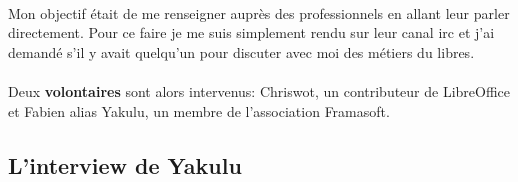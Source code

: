 \documentclass[a4paper,12pt, draft]{report}
\begin{document}
\paragraph{}
Mon objectif était de me renseigner auprès des professionnels en allant leur parler directement. Pour ce faire je me suis simplement rendu sur leur canal irc et j'ai demandé s'il y avait quelqu'un pour discuter avec moi des métiers du libres. 

\paragraph{}
Deux \textbf{volontaires} sont alors intervenus: Chriswot, un contributeur de LibreOffice et Fabien alias Yakulu, un membre de l'association Framasoft.


\subsection{L'interview de Yakulu}
\end{document}
